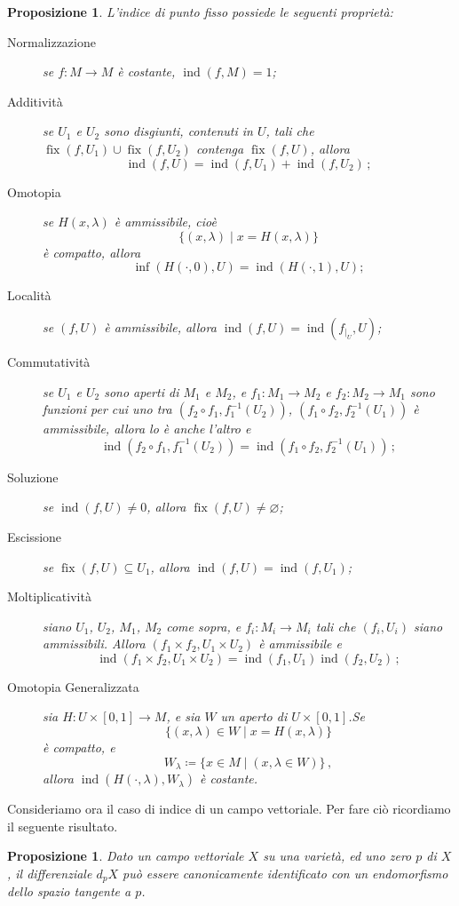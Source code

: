 \documentclass[a4paper, 11pt]{article}
\theoremstyle{definition}
\theoremstyle{plain}
\newtheorem{Prop}[Def]{Proposizione}
\newcommand{\eset}{\varnothing}
\newcommand{\restr}[2]{{#1}_{|_{#2}}}
\newcommand{\deff}{\coloneqq}
\DeclareMathOperator{\ind}{ind}
\DeclareMathOperator{\fix}{fix}
\begin{document}
\begin{Prop}
	L'indice di punto fisso possiede le seguenti proprietà:
\begin{description}
	\item[Normalizzazione] se $f \colon M \to M$ è costante, $\ind(f,M) = 1$;
	\item[Additività] se $U_1$ e $U_2$ sono disgiunti, contenuti in $U$, tali che $\fix(f,U_1) \cup \fix(f,U_2)$ contenga $\fix(f,U)$, allora
	\[
		\ind(f,U) = \ind(f,U_1) + \ind(f,U_2)\,;
	\]
	\item[Omotopia] se $H(x,\lambda)$ è ammissibile, cioè 
	\[
		\{(x,\lambda) \mid x = H(x,\lambda)\}
	\]
	è compatto, allora 
	\[
		\inf(H(\cdot, 0), U) = \ind(H(\cdot, 1),U);
	\]
	\item[Località] se $(f,U)$ è ammissibile, allora $\ind(f,U) = \ind(\restr{f}{U},U)$;
	\item[Commutatività] se $U_1$ e $U_2$ sono aperti di $M_1$ e $M_2$, e $f_1 \colon M_1 \to M_2$ e $f_2 \colon M_2 \to M_1$ sono funzioni per cui uno tra $(f_2 \circ f_1, f_1^{-1}(U_2))$, $(f_1 \circ f_2, f_2^{-1}(U_1))$ è ammissibile, allora lo è anche l'altro e
	\[
			\ind(f_2 \circ f_1, f_1^{-1}(U_2)) = \ind(f_1 \circ f_2, f_2^{-1}(U_1))\,;
	\]
	\item[Soluzione] se $\ind(f,U) \neq 0$, allora $\fix(f,U) \neq \eset$;
	\item[Escissione] se $\fix(f,U) \subseteq U_1$, allora $\ind(f,U) =\ind(f,U_1)$;
	\item[Moltiplicatività] siano $U_1$, $U_2$, $M_1$, $M_2$ come sopra, e $f_i \colon M_i \to M_i$ tali che $(f_i, U_i)$ siano ammissibili. Allora $(f_1 \times f_2, U_1 \times U_2)$ è ammissibile e 
	\[
		\ind(f_1 \times f_2, U_1 \times U_2) = \ind(f_1, U_1)\ind(f_2, U_2)\,;
	\]
	\item[Omotopia Generalizzata] sia $H \colon U \times [0,1]\to M$, e sia $W$ un aperto di $U \times [0,1]$.Se
	\[
		\{(x, \lambda) \in W \mid x = H(x,\lambda)\}
	\]
	è compatto, e
	\[
		W_\lambda \deff \{x \in M \mid (x, \lambda \in W)\}\,,
	\]
	allora $\ind(H(\cdot, \lambda), W_\lambda)$ è costante.
\end{description}
\end{Prop}
Consideriamo ora il caso di indice di un campo vettoriale. Per fare ciò ricordiamo il seguente risultato.
\begin{Prop}
	Dato un campo vettoriale  $X$ su una varietà, ed uno zero $p$ di $X$, il differenziale $d_pX$ può essere canonicamente identificato con un endomorfismo dello spazio tangente a $p$.
\end{Prop}
\end{document}
